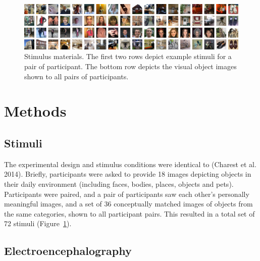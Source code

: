 \documentclass[10pt,letterpaper]{article}
\begin{document}
\begin{figure}[t]
\begin{center}
\includegraphics[width=\linewidth]{figures/figure1.png}
\end{center}
\caption{
  Stimulus materials. The first two rows depict example 
  stimuli for a pair of participant. The bottom row depicts the 
  visual object images shown to all pairs of participants.
} 
\label{fig1}
\end{figure}

\section{Methods}

\subsection{Stimuli}

The experimental design and stimulus conditions were identical to 
(Charest et al. 2014). Briefly, participants were asked to provide 
18 images depicting objects in their daily environment (including 
faces, bodies, places, objects and pets). Participants were paired, 
and a pair of participants saw each other’s personally meaningful 
images, and a set of 36 conceptually matched images of objects from 
the same categories, shown to all participant pairs. This resulted 
in a total set of 72 stimuli (Figure~\ref{fig1}).


\subsection{Electroencephalography}
\end{document}
